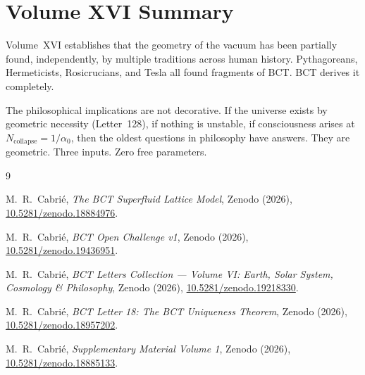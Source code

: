 \documentclass[aps,prl,twocolumn,showpacs,preprintnumbers]{revtex4-2}
\begin{document}
\section*{Volume XVI Summary}

Volume~XVI establishes that the geometry of the vacuum has been
partially found, independently, by multiple traditions across
human history. Pythagoreans, Hermeticists, Rosicrucians, and Tesla
all found fragments of BCT. BCT derives it completely.

The philosophical implications are not decorative. If the universe
exists by geometric necessity (Letter~128), if nothing is unstable,
if consciousness arises at $N_{\mathrm{collapse}} = 1/\alpha_0$,
then the oldest questions in philosophy have answers. They are
geometric. Three inputs. Zero free parameters.

\begin{thebibliography}{9}

M.~R.\ Cabri\'e,
\textit{The BCT Superfluid Lattice Model},
Zenodo (2026),
\href{https://doi.org/10.5281/zenodo.18884976}{10.5281/zenodo.18884976}.

M.~R.\ Cabri\'e,
\textit{BCT Open Challenge v1},
Zenodo (2026),
\href{https://doi.org/10.5281/zenodo.19436951}{10.5281/zenodo.19436951}.

M.~R.\ Cabri\'e,
\textit{BCT Letters Collection --- Volume VI: Earth, Solar System,
Cosmology \& Philosophy},
Zenodo (2026),
\href{https://doi.org/10.5281/zenodo.19218330}{10.5281/zenodo.19218330}.

M.~R.\ Cabri\'e,
\textit{BCT Letter 18: The BCT Uniqueness Theorem},
Zenodo (2026),
\href{https://doi.org/10.5281/zenodo.18957202}{10.5281/zenodo.18957202}.

M.~R.\ Cabri\'e,
\textit{Supplementary Material Volume 1},
Zenodo (2026),
\href{https://doi.org/10.5281/zenodo.18885133}{10.5281/zenodo.18885133}.

\end{thebibliography}
\end{document}
